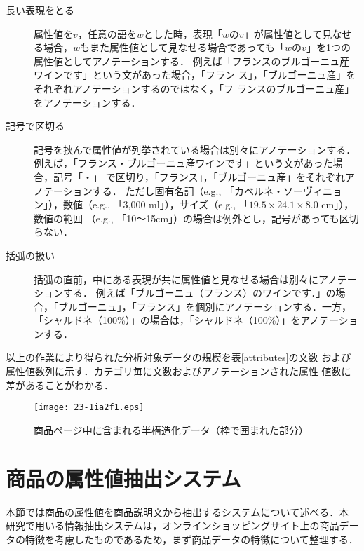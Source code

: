 \documentclass[japanese]{jnlp_1.4}
\begin{document}
\begin{description}
\item [長い表現をとる] 
属性値を$v$，任意の語を$w$とした時，表現「$w$の$v$」が属性値として見なせる場合，$w$もまた属性値として見なせる場合であっても「$w$の$v$」を1つの属性値としてアノテーションする．
例えば「フランスのブルゴーニュ産ワインです」という文があった場合，「フラン
  ス」，「ブルゴーニュ産」をそれぞれアノテーションするのではなく，「フ
  ランスのブルゴーニュ産」をアノテーションする．

\item [記号で区切る] 
記号を挟んで属性値が列挙されている場合は別々にアノテーションする．
例えば，「フランス・ブルゴーニュ産ワインです」という文があった場合，記号「・」
で区切り，「フランス」，「ブルゴーニュ産」をそれぞれアノテーションする．
ただし固有名詞（e.g., 「カベルネ・ソーヴィニョン」），数値（e.g.,
  「3,000 ml」），サイズ（e.g., 「$19.5\times 24.1 \times 8.0$ cm」），数値の範囲
（e.g., 「10〜15cm」）の場合は例外とし，記号があっても区切らない．

\item [括弧の扱い]
括弧の直前，中にある表現が共に属性値と見なせる場合は別々にアノテーションする．
例えば「ブルゴーニュ（フランス）のワインです．」の場合，「ブルゴーニュ」，「フランス」を個別にアノテーションする．一方，
「シャルドネ（100\%）」の場合は，「シャルドネ（100\%）」をアノテーションする．
\end{description}

\noindent
以上の作業により得られた分析対象データの規模を表\ref{attributes}の文数
および属性値数列に示す．カテゴリ毎に文数およびアノテーションされた属性
値数に差があることがわかる．

\begin{figure}[b]
\begin{center}
\texttt{[image: 23-1ia2f1.eps]}
\end{center}
\caption{商品ページ中に含まれる半構造化データ（枠で囲まれた部分）}
\label{semi-structured-data}
\end{figure}



\section{商品の属性値抽出システム}
\label{system}

本節では商品の属性値を商品説明文から抽出するシステムについて述べる．本
研究で用いる情報抽出システムは，オンラインショッピングサイト上の商品デー
タの特徴を考慮したものであるため，まず商品データの特徴について整理する．
\end{document}
